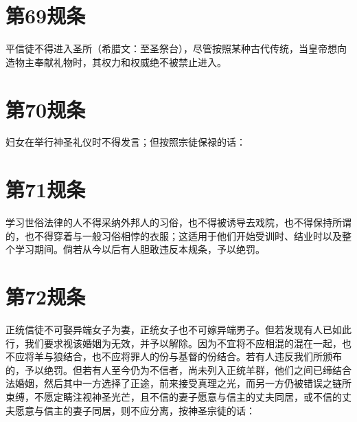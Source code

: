 
\section{第69规条}

平信徒不得进入圣所（希腊文：至圣祭台），尽管按照某种古代传统，当皇帝想向造物主奉献礼物时，其权力和权威绝不被禁止进入。\par


\section{第70规条}

妇女在举行神圣礼仪时不得发言；但按照宗徒保禄的话：\par


\section{第71规条}

学习世俗法律的人不得采纳外邦人的习俗，也不得被诱导去戏院，也不得保持所谓的，也不得穿着与一般习俗相悖的衣服；这适用于他们开始受训时、结业时以及整个学习期间。倘若从今以后有人胆敢违反本规条，予以绝罚。\par


\section{第72规条}

正统信徒不可娶异端女子为妻，正统女子也不可嫁异端男子。但若发现有人已如此行，我们要求视该婚姻为无效，并予以解除。因为不宜将不应相混的混在一起，也不应将羊与狼结合，也不应将罪人的份与基督的份结合。若有人违反我们所颁布的，予以绝罚。但若有人至今仍为不信者，尚未列入正统羊群，他们之间已缔结合法婚姻，然后其中一方选择了正途，前来接受真理之光，而另一方仍被错误之链所束缚，不愿定睛注视神圣光芒，且不信的妻子愿意与信主的丈夫同居，或不信的丈夫愿意与信主的妻子同居，则不应分离，按神圣宗徒的话：\par

